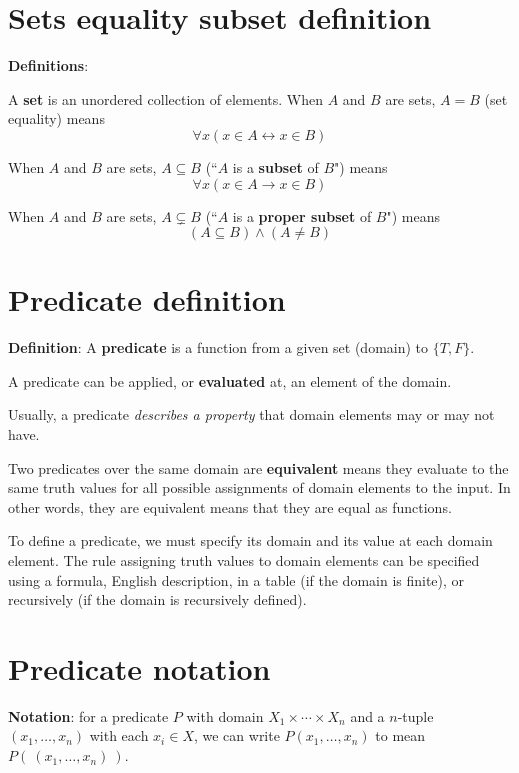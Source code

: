 \documentclass[12pt, oneside]{article}
\begin{document}
\begin{flushright}
\end{flushright} \section*{Sets equality subset definition}


{\bf Definitions}:

A {\bf set} is an  unordered collection of  elements.
When $A$ and  $B$ are sets,  $A = B$ (set equality) means  
\[
    \forall x  ( x\in A \leftrightarrow x \in B)
\]

When $A$ and  $B$ are sets, $A \subseteq B$ (``$A$ is a {\bf subset} of $B$") means 
\[
    \forall x  (x \in A  \to x  \in B)
\]

When $A$ and  $B$ are sets,  $A \subsetneq B$ (``$A$ is a {\bf proper subset} of $B$") means 
\[
    (A\subseteq B) \wedge  (A \neq B)
\] \vfill
\section*{Predicate definition}


{\bf  Definition}: A  {\bf predicate}  is  a function from a given set (domain) to $\{T,F\}$.

A predicate can be applied, or {\bf evaluated} at, an element of the domain.

Usually, a predicate {\it describes a  property} that domain elements may or may not have.

Two predicates over the same domain are {\bf equivalent} means they evaluate to
the same truth values for all possible assignments of domain elements to the
input. In other words, they are equivalent means that they are equal as functions.

To define a predicate, we must specify its domain and its value at each domain element.
The rule assigning truth values to domain elements can be specified using a formula, 
English description, in a table (if the domain is finite), or recursively (if the domain is recursively
defined). \vfill
\section*{Predicate notation}


{\bf Notation}: for a predicate $P$ with domain $X_1 \times \cdots \times X_n$ and a 
$n$-tuple $(x_1, \ldots, x_n)$ 
with each $x_i \in X$, we 
can write $P(x_1, \ldots, x_n)$ to mean $P( ~(x_1, \ldots, x_n)~)$.
 \vfill
\end{document}

